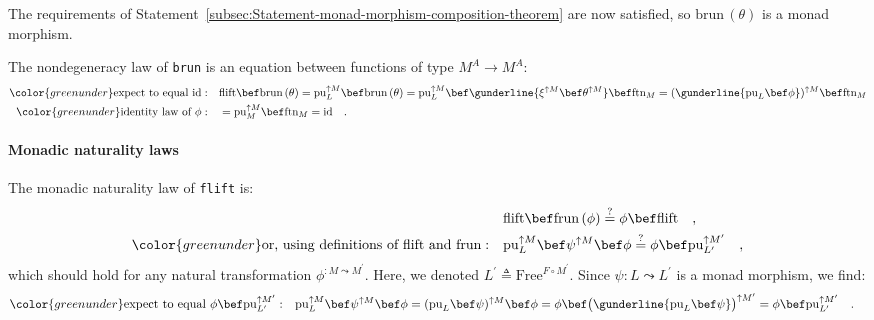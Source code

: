 The requirements of Statement~\ref{subsec:Statement-monad-morphism-composition-theorem}
are now satisfied, so $\text{brun}\,(\theta)$ is a monad morphism.

The nondegeneracy law of \lstinline!brun! is an equation between
functions of type $M^{A}\rightarrow M^{A}$:
\begin{align*}
{\color{greenunder}\text{expect to equal }\text{id}:}\quad & \text{flift}\bef\text{brun}\,(\theta)=\text{pu}_{L}^{\uparrow M}\bef\text{brun}\,(\theta)=\text{pu}_{L}^{\uparrow M}\bef\gunderline{\xi^{\uparrow M}\bef\theta^{\uparrow M}}\bef\text{ftn}_{M}=(\gunderline{\text{pu}_{L}\bef\phi})^{\uparrow M}\bef\text{ftn}_{M}\\
{\color{greenunder}\text{identity law of }\phi:}\quad & =\text{pu}_{M}^{\uparrow M}\bef\text{ftn}_{M}=\text{id}\quad.
\end{align*}


\paragraph{Monadic naturality laws}

The monadic naturality law of \lstinline!flift! is:
\begin{align*}
 & \text{flift}\bef\text{frun}\,(\phi)\overset{?}{=}\phi\bef\text{flift}\quad,\\
{\color{greenunder}\text{or, using definitions of }\text{flift}\text{ and }\text{frun}:}\quad & \text{pu}_{L}^{\uparrow M}\bef\psi^{\uparrow M}\bef\phi\overset{?}{=}\phi\bef\text{pu}_{L^{\prime}}^{\uparrow M^{\prime}}\quad,
\end{align*}
which should hold for any natural transformation $\phi^{:M\leadsto M^{\prime}}$.
Here, we denoted $L^{\prime}\triangleq\text{Free}^{F\circ M^{\prime}}$.
Since $\psi:L\leadsto L^{\prime}$ is a monad morphism, we find:
\begin{align*}
{\color{greenunder}\text{expect to equal }\phi\bef\text{pu}_{L^{\prime}}^{\uparrow M^{\prime}}:}\quad & \text{pu}_{L}^{\uparrow M}\bef\psi^{\uparrow M}\bef\phi=(\text{pu}_{L}\bef\psi)^{\uparrow M}\bef\phi=\phi\bef\big(\gunderline{\text{pu}_{L}\bef\psi}\big)^{\uparrow M^{\prime}}=\phi\bef\text{pu}_{L^{\prime}}^{\uparrow M^{\prime}}\quad.
\end{align*}

